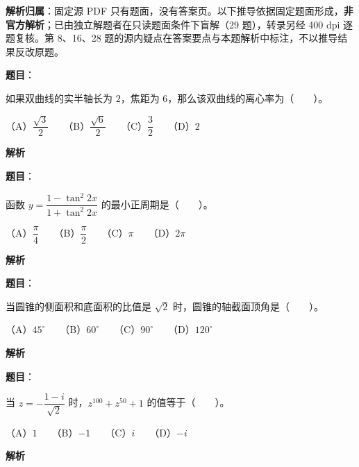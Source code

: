 

\begin{gknotice}
\textbf{解析归属}：固定源 PDF 只有题面，没有答案页。以下推导依据固定题面形成，\textbf{非官方解析}；已由独立解题者在只读题面条件下盲解（29 题），转录另经 400 dpi 逐题复核。第 8、16、28 题的源内疑点在答案要点与本题解析中标注，不以推导结果反改原题。
\end{gknotice}

\begin{answer}

\textbf{题目}：

如果双曲线的实半轴长为 $2$，焦距为 $6$，那么该双曲线的离心率为\mbox{（　　）}。

（A）$\dfrac{\sqrt3}{2}$　　（B）$\dfrac{\sqrt6}{2}$　　（C）$\dfrac32$　　（D）$2$

\textbf{解析}


\end{answer}
\begin{answer}

\textbf{题目}：

函数 $y=\dfrac{1-\tan^2 2x}{1+\tan^2 2x}$ 的最小正周期是\mbox{（　　）}。

（A）$\dfrac\pi4$　　（B）$\dfrac\pi2$　　（C）$\pi$　　（D）$2\pi$

\textbf{解析}


\end{answer}
\begin{answer}

\textbf{题目}：

当圆锥的侧面积和底面积的比值是 $\sqrt2$ 时，圆锥的轴截面顶角是\mbox{（　　）}。

（A）$45^\circ$　　（B）$60^\circ$　　（C）$90^\circ$　　（D）$120^\circ$

\textbf{解析}


\end{answer}
\begin{answer}

\textbf{题目}：

当 $z=-\dfrac{1-i}{\sqrt2}$ 时，$z^{100}+z^{50}+1$ 的值等于\mbox{（　　）}。

（A）$1$　　（B）$-1$　　（C）$i$　　（D）$-i$

\textbf{解析}


\end{answer}
